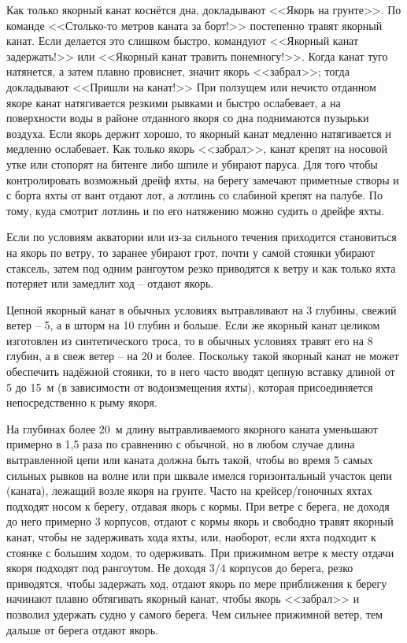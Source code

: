 Как только якорный канат коснётся дна, докладывают <<Якорь на
грунте>>. По команде <<Столько-то метров каната за борт!>> постепенно
травят якорный канат. Если делается это слишком быстро, командуют
<<Якорный канат задержать!>> или <<Якорный канат травить
понемногу!>>. Когда канат туго натянется, а затем плавно провиснет,
значит якорь <<забрал>>; тогда докладывают <<Пришли на канат!>> При
ползущем или нечисто отданном якоре канат натягивается резкими рывками
и быстро ослабевает, а на поверхности воды в районе отданного якоря со
дна поднимаются пузырьки воздуха. Если якорь держит хорошо, то якорный
канат медленно натягивается и медленно ослабевает. Как только якорь
<<забрал>>, канат крепят на носовой утке или стопорят на битенге либо
шпиле и убирают паруса. Для того чтобы контролировать возможный дрейф
яхты, на берегу замечают приметные створы и с борта яхты от вант
отдают лот, а лотлинь со слабиной крепят на палубе. По тому, куда
смотрит лотлинь и по его натяжению можно судить о дрейфе яхты.

Если по условиям акватории или из-за сильного течения приходится
становиться на якорь по ветру, то заранее убирают грот, почти у самой
стоянки убирают стаксель, затем под одним рангоутом резко приводятся к
ветру и как только яхта потеряет или замедлит ход \--- отдают якорь.

Цепной якорный канат в обычных условиях вытравливают на 3 глубины,
свежий ветер \--- 5, а в шторм на 10 глубин и больше. Если же
якорный канат целиком изготовлен из синтетического троса, то в обычных
условиях травят его на 8 глубин, а в свеж ветер \--- на 20 и
более. Поскольку такой якорный канат не может обеспечить надёжной
стоянки, то в него часто вводят цепную вставку длиной от 5 до 15~м (в
зависимости от водоизмещения яхты), которая присоединяется
непосредственно к рыму якоря.

На глубинах более 20~м длину вытравливаемого якорного каната уменьшают
примерно в 1,5 раза по сравнению с обычной, но в любом случае длина
вытравленной цепи или каната должна быть такой, чтобы во время 5 самых
сильных рывков на волне или при шквале имелся горизонтальный участок
цепи (каната), лежащий возле якоря на грунте. Часто на
крейсер\-/гоночных яхтах подходят носом к берегу, отдавая якорь с
кормы. При ветре с берега, не доходя до него примерно 3 корпусов,
отдают с кормы якорь и свободно травят якорный канат, чтобы не
задерживать хода яхты, или, наоборот, если яхта подходит к стоянке с
большим ходом, то одерживать. При прижимном ветре к месту отдачи якоря
подходят под рангоутом. Не доходя 3\-/4 корпусов до берега, резко
приводятся, чтобы задержать ход, отдают якорь по мере приближения к
берегу начинают плавно обтягивать якорный канат, чтобы якорь
<<забрал>> и позволил удержать судно у самого берега. Чем сильнее
прижимной ветер, тем дальше от берега отдают якорь.

